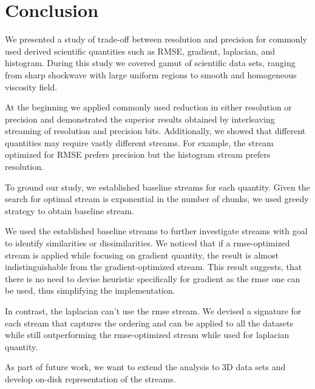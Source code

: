 \section{Conclusion}
We presented a study of trade-off between resolution and precision for commonly used derived
scientific quantities such as RMSE, gradient, laplacian, and histogram. During this study we
covered gamut of scientific data sets, ranging from sharp shockwave with large uniform regions
to smooth and homogeneous viscosity field.

At the beginning we applied commonly used reduction in either resolution or precision and
demonstrated the superior results obtained by interleaving streaming of resolution and precision
bits. Additionally, we showed that different quantities may require vastly different streams.
For example, the stream optimized for RMSE prefers precision but the histogram stream prefers
resolution.

To ground our study, we established baseline streams for each quantity. Given the search
for optimal stream is exponential in the number of chunks, we used greedy strategy to obtain
baseline stream.

We used the established baseline streams to further investigate streams with goal to identify
similarities or dissimilarities. We noticed that if a rmse-optimized stream is applied while
focusing on gradient quantity, the result is almost indistinguishable from the gradient-optimized
stream. This result suggests, that there is no need to devise heuristic specifically for gradient
as the rmse one can be used, thus simplifying the implementation.

In contrast, the laplacian can't use the rmse stream. We devised a signature for each stream that
captures the ordering and can be applied to all the datasets while still outperforming the
rmse-optimized stream while used for laplacian quantity.




As part of future work, we want to extend the analysis to 3D data sets and develop on-disk
representation of the streams.
